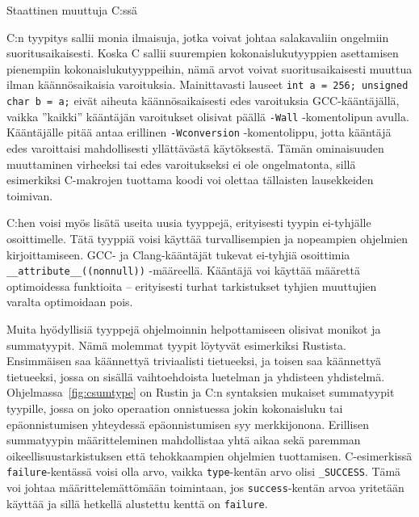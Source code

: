 \begin{listing}[ht!]
    \inputminted{C}{koodi/static.c}
    \caption{Staattinen muuttuja C:ssä}
    \label{fig:cstatic}
\end{listing}

\grayrule

C:n tyypitys sallii monia ilmaisuja, jotka voivat johtaa salakavaliin ongelmiin
suoritusaikaisesti. Koska C sallii suurempien kokonaislukutyyppien asettamisen
pienempiin kokonaislukutyyppeihin, nämä arvot voivat suoritusaikaisesti muuttua
ilman käännösaikaisia varoituksia. Mainittavasti lauseet \texttt{int a = 256;
unsigned char b = a;} eivät aiheuta käännösaikaisesti edes varoituksia
GCC-kääntäjällä, vaikka ''kaikki'' kääntäjän varoitukset olisivat päällä
\texttt{-Wall} -komentolipun avulla. Kääntäjälle pitää antaa erillinen
\texttt{-Wconversion} -komentolippu, jotta kääntäjä edes varoittaisi
mahdollisesti yllättävästä käytöksestä. Tämän ominaisuuden muuttaminen
virheeksi tai edes varoitukseksi ei ole ongelmatonta, sillä esimerkiksi
C-makrojen tuottama koodi voi olettaa tällaisten lausekkeiden toimivan.

C:hen voisi myös lisätä useita uusia tyyppejä, erityisesti tyypin ei-tyhjälle
osoittimelle. Tätä tyyppiä voisi käyttää turvallisempien ja nopeampien
ohjelmien kirjoittamiseen. GCC- ja Clang-kääntäjät tukevat ei-tyhjiä osoittimia
\texttt{\_\_attribute\_\_((nonnull))} -määreellä. Kääntäjä voi käyttää määrettä
optimoidessa funktioita -- erityisesti turhat tarkistukset tyhjien muuttujien
varalta optimoidaan pois.

Muita hyödyllisiä tyyppejä ohjelmoinnin helpottamiseen olisivat
monikot ja summatyypit. Nämä
molemmat tyypit löytyvät esimerkiksi Rustista. Ensimmäisen saa käännettyä
triviaalisti tietueeksi, ja toisen saa käännettyä tietueeksi, jossa on sisällä
vaihtoehdoista luetelman ja yhdisteen
yhdistelmä. Ohjelmassa~\ref{fig:csumtype} on Rustin ja C:n syntaksien mukaiset
summatyypit tyypille, jossa on joko operaation onnistuessa jokin kokonaisluku
tai epäonnistumisen yhteydessä epäonnistumisen syy merkkijonona. Erillisen
summatyypin määritteleminen mahdollistaa yhtä aikaa sekä paremman
oikeellisuustarkistuksen että tehokkaampien ohjelmien tuottamisen.
C-esimerkissä \texttt{failure}-kentässä voisi olla arvo, vaikka
\texttt{type}-kentän arvo olisi \texttt{\_SUCCESS}. Tämä voi johtaa
määrittelemättömään toimintaan, jos \texttt{success}-kentän arvoa yritetään
käyttää ja sillä hetkellä alustettu kenttä on \texttt{failure}.

